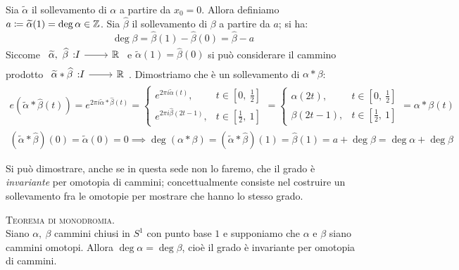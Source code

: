 \begin{demonstration}
	Sia $\widetilde{\alpha}$ il sollevamento di $\alpha$ a partire da $x_0=0$. Allora definiamo $a\coloneqq \widetilde{\alpha}(1)=\deg\alpha\in\mathbb{Z}$. Sia $\widehat{\beta}$ il sollevamento di $\beta$ a partire da $a$; si ha:
	\begin{equation*}
		\deg\beta=\widehat{\beta}(1)-\widehat{\beta}(0)=\widehat{\beta}-a
	\end{equation*} 
	Siccome $\funz {\widetilde{\alpha},\ \widehat{\beta}} I \realset$ e $\widetilde{\alpha}(1)=\widehat{\beta}(0)$ si può considerare il cammino prodotto $\funz {\widetilde{\alpha}\ast\widehat{\beta}} I \realset$. Dimostriamo che è un sollevamento di $\alpha\ast\beta$:
		\begin{gather*}
			e\left( \widetilde{\alpha}\ast\widehat{\beta}(t) \right)= e^{2\pi i \widetilde{\alpha}\ast\widehat{\beta}(t)}=\begin{cases}
				e^{2\pi i \widetilde{\alpha}(t)}, & t\in \left[ 0,\ \frac{1}{2} \right]\\
				e^{2\pi i \widehat{\beta}(2t-1)}, & t\in \left[ \frac{1}{2},\ 1 \right]
			\end{cases}=\begin{cases}
				\alpha(2t), & t\in \left[ 0,\ \frac{1}{2} \right]\\
				\beta(2t-1), & t\in \left[ \frac{1}{2},\ 1 \right]
			\end{cases}= \alpha\ast\beta(t)\\
			(\widetilde{\alpha}\ast\widehat{\beta})(0)=\widetilde{\alpha}(0)=0 \implies \deg(\alpha\ast\beta)=(\widetilde{\alpha}\ast\widehat{\beta})(1)=\widehat{\beta}(1)=a+\deg\beta=\deg\alpha +\deg\beta 
		\end{gather*}
\end{demonstration}
Si può dimostrare, anche se in questa sede non lo faremo, che il grado è \textit{invariante} per omotopia di cammini; concettualmente consiste nel costruire un sollevamento fra le omotopie per mostrare che hanno lo stesso grado.
\begin{theorema} \textsc{Teorema di monodromia.}\\
	Siano $\alpha,\ \beta$ cammini chiusi in $S^1$ con punto base $1$ e supponiamo che $\alpha$ e $\beta$ siano cammini omotopi. Allora $\deg\alpha=\deg\beta$, cioè il grado è invariante per omotopia di cammini.
\end{theorema}

